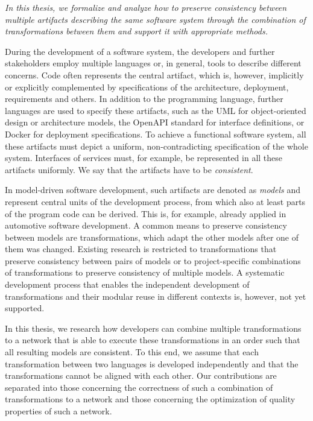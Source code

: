 \emph{In this thesis, we formalize and analyze how to preserve consistency between multiple artifacts describing the same software system through the combination of transformations between them%
and support it with appropriate methods.}

During the development of a software system, the developers and further stakeholders employ multiple languages or, in general, tools to describe different concerns.
Code often represents the central artifact, which is, however, implicitly or explicitly complemented by specifications of the architecture, deployment, requirements and others.
In addition to the programming language, further languages are used to specify these artifacts, such as the \acrshort{UML} for object-oriented design or architecture models, the OpenAPI standard for interface definitions, or Docker for deployment specifications.
To achieve a functional software system, all these artifacts must depict a uniform, non-contradicting specification of the whole system.
Interfaces of services must, for example, be represented in all these artifacts uniformly.
We say that the artifacts have to be \emph{consistent}.

In model-driven software development, such artifacts are denoted as \emph{models} and represent central units of the development process, from which also at least parts of the program code can be derived.
This is, for example, already applied in automotive software development.
A common means to preserve consistency between models are transformations, which adapt the other models after one of them was changed.
Existing research is restricted to transformations that preserve consistency between pairs of models or to project-specific combinations of transformations to preserve consistency of multiple models. %
A systematic development process that enables the independent development of transformations and their modular reuse in different contexts is, however, not yet supported.

In this thesis, we research how developers can combine multiple transformations to a network that is able to execute these transformations in an order such that all resulting models are consistent.
To this end, we assume that each transformation between two languages is developed independently and that the transformations cannot be aligned with each other.
Our contributions are separated into those concerning the correctness of such a combination of transformations to a network and those concerning the optimization of quality properties of such a network.

